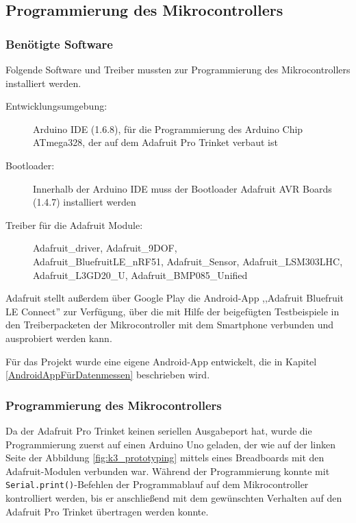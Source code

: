 \subsection{Programmierung des Mikrocontrollers}
\label{kapitel_programmierungMikrocontroller}
 
\subsubsection{Benötigte Software}

Folgende Software und Treiber mussten zur Programmierung des Mikrocontrollers installiert werden.

\begin{description}
	\item[Entwicklungsumgebung:] Arduino IDE (1.6.8), für die Programmierung des Arduino Chip ATmega328, der auf dem Adafruit Pro Trinket verbaut ist
	\item[Bootloader:] Innerhalb der Arduino IDE muss der Bootloader Adafruit AVR Boards (1.4.7) installiert werden
	\item[Treiber für die Adafruit Module:] Adafruit\_driver, Adafruit\_9DOF, \\ Adafruit\_BluefruitLE\_nRF51, Adafruit\_Sensor, Adafruit\_LSM303LHC, \\ Adafruit\_L3GD20\_U, Adafruit\_BMP085\_Unified
\end{description}

Adafruit stellt außerdem über Google Play die Android-App ,,Adafruit Bluefruit LE Connect'' zur Verfügung, über die mit Hilfe der beigefügten Testbeispiele in den Treiberpacketen der Mikrocontroller mit dem Smartphone verbunden und ausprobiert werden kann. 

Für das Projekt wurde eine eigene Android-App entwickelt, die in Kapitel \ref{AndroidAppFürDatenmessen} beschrieben wird.

\subsubsection{Programmierung des Mikrocontrollers}
Da der Adafruit Pro Trinket keinen seriellen Ausgabeport hat, wurde die Programmierung zuerst auf einen Arduino Uno geladen, der wie auf der linken Seite der Abbildung \ref{fig:k3_prototyping} mittels eines Breadboards mit den Adafruit-Modulen verbunden war. Während der Programmierung konnte mit \texttt{Serial.print()}-Befehlen der Programmablauf auf dem Mikrocontroller kontrolliert werden, bis er anschließend mit dem gewünschten Verhalten auf den Adafruit Pro Trinket übertragen werden konnte.

